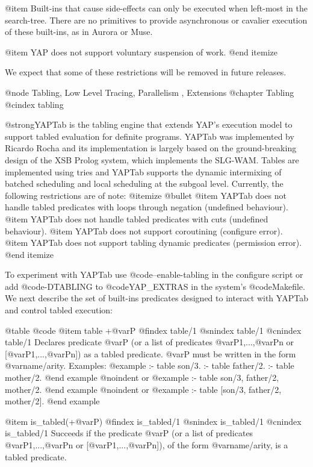 {{{{{{{{{@item Built-ins that cause side-effects can only be executed when
left-most in the search-tree. There are no primitives to provide
asynchronous or cavalier execution of these built-ins, as in Aurora or
Muse.

@item YAP does not support voluntary suspension of work.
@end itemize

We expect that some of these restrictions will be removed in future
releases.

@node Tabling, Low Level Tracing, Parallelism , Extensions
@chapter Tabling
@cindex tabling

@strong{YAPTab} is the tabling engine that extends YAP's execution
model to support tabled evaluation for definite programs. YAPTab was
implemented by Ricardo Rocha and its implementation is largely based
on the ground-breaking design of the XSB Prolog system, which
implements the SLG-WAM. Tables are implemented using tries and YAPTab
supports the dynamic intermixing of batched scheduling and local
scheduling at the subgoal level. Currently, the following restrictions
are of note:
@itemize @bullet
@item YAPTab does not handle tabled predicates with loops through negation (undefined behaviour).
@item YAPTab does not handle tabled predicates with cuts (undefined behaviour).
@item YAPTab does not support coroutining (configure error).
@item YAPTab does not support tabling dynamic predicates (permission error).
@end itemize

To experiment with YAPTab use @code{--enable-tabling} in the configure
script or add @code{-DTABLING} to @code{YAP_EXTRAS} in the system's
@code{Makefile}. We next describe the set of built-ins predicates
designed to interact with YAPTab and control tabled execution:

@table @code
@item table +@var{P}
@findex table/1
@snindex table/1
@cnindex table/1
Declares predicate @var{P} (or a list of predicates
@var{P1},...,@var{Pn} or [@var{P1},...,@var{Pn}]) as a tabled
predicate. @var{P} must be written in the form
@var{name/arity}. Examples:
@example
:- table son/3.
:- table father/2.
:- table mother/2.
@end example
@noindent or
@example
:- table son/3, father/2, mother/2.
@end example
@noindent or
@example
:- table [son/3, father/2, mother/2].
@end example

@item is_tabled(+@var{P})
@findex is_tabled/1
@snindex is_tabled/1
@cnindex is_tabled/1
Succeeds if the predicate @var{P} (or a list of predicates
@var{P1},...,@var{Pn} or [@var{P1},...,@var{Pn}]), of the form
@var{name/arity}, is a tabled predicate.

}}}}}}}}}
